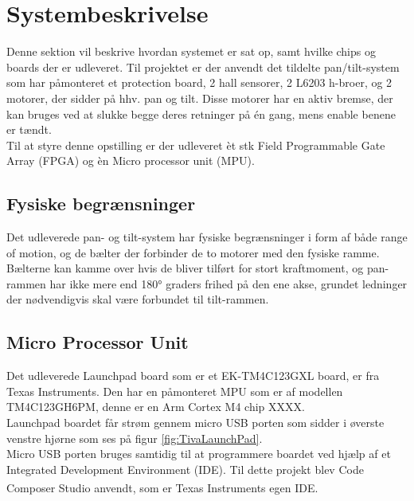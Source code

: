 \section{Systembeskrivelse}
Denne sektion vil beskrive hvordan systemet er sat op, samt hvilke chips og boards der er udleveret.
Til projektet er der anvendt det tildelte pan/tilt-system som har påmonteret et protection board, 2 hall sensorer, 2 L6203 h-broer, og 2 motorer, der sidder på hhv. pan og tilt. Disse motorer har en aktiv bremse, der kan bruges ved at slukke begge deres retninger på én gang, mens enable benene er tændt.\\
Til at styre denne opstilling er der udleveret èt stk Field Programmable Gate Array (FPGA) og èn Micro processor unit (MPU).
\\

\subsection{Fysiske begrænsninger}

Det udleverede pan- og tilt-system har fysiske begrænsninger i form af både range of motion, og de bælter der forbinder de to motorer med den fysiske ramme. Bælterne kan kamme over hvis de bliver tilført for stort kraftmoment, og pan-rammen har ikke mere end 180° graders frihed på den ene akse, grundet ledninger der nødvendigvis skal være forbundet til tilt-rammen.

\subsection{Micro Processor Unit}
Det udleverede Launchpad board som er et EK-TM4C123GXL board, er fra Texas Instruments. Den har en påmonteret MPU som er af modellen TM4C123GH6PM, denne er en Arm Cortex M4 chip \cite{TM4C123GH6PMDatasheet}XXXX.\\
Launchpad boardet får strøm gennem micro USB porten som sidder i øverste venstre hjørne som ses på figur \ref{fig:TivaLaunchPad}.\\
Micro USB porten bruges samtidig til at programmere boardet ved hjælp af et Integrated Development Environment (IDE). Til dette projekt blev Code Composer Studio \textsuperscript{\texttrademark} anvendt, som er Texas Instruments egen IDE.

